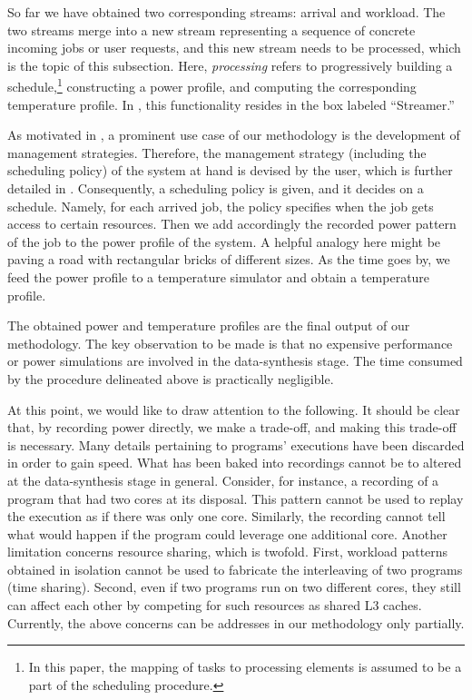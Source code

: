So far we have obtained two corresponding streams: arrival and workload. The two
streams merge into a new stream representing a sequence of concrete incoming
jobs or user requests, and this new stream needs to be processed, which is the
topic of this subsection. Here, \emph{processing} refers to progressively
building a schedule,\footnote{In this paper, the mapping of tasks to processing
elements is assumed to be a part of the scheduling procedure.} constructing a
power profile, and computing the corresponding temperature profile. In
, this functionality resides in the box labeled ``Streamer.''

As motivated in , a prominent use case of our methodology is
the development of management strategies. Therefore, the management strategy
(including the scheduling policy) of the system at hand is devised by the user,
which is further detailed in . Consequently, a scheduling policy is
given, and it decides on a schedule. Namely, for each arrived job, the policy
specifies when the job gets access to certain resources. Then we add accordingly
the recorded power pattern of the job to the power profile of the system. A
helpful analogy here might be paving a road with rectangular bricks of different
sizes. As the time goes by, we feed the power profile to a temperature simulator
and obtain a temperature profile.

The obtained power and temperature profiles are the final output of our
methodology. The key observation to be made is that no expensive performance or
power simulations are involved in the data-synthesis stage. The time consumed by
the procedure delineated above is practically negligible.

At this point, we would like to draw attention to the following. It should be
clear that, by recording power directly, we make a trade-off, and making this
trade-off is necessary. Many details pertaining to programs' executions have
been discarded in order to gain speed. What has been baked into recordings
cannot be to altered at the data-synthesis stage in general. Consider, for
instance, a recording of a program that had two cores at its disposal. This
pattern cannot be used to replay the execution as if there was only one core.
Similarly, the recording cannot tell what would happen if the program could
leverage one additional core. Another limitation concerns resource sharing,
which is twofold. First, workload patterns obtained in isolation cannot be used
to fabricate the interleaving of two programs (time sharing). Second, even if
two programs run on two different cores, they still can affect each other by
competing for such resources as shared L3 caches. Currently, the above concerns
can be addresses in our methodology only partially.
